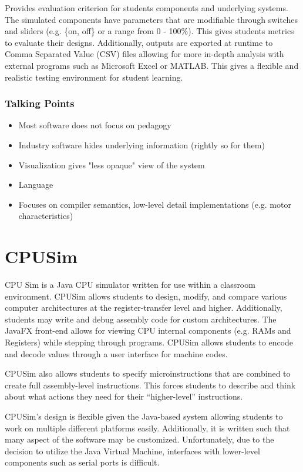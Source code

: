 Provides evaluation criterion for students components and underlying systems. The simulated components have parameters that are modifiable through switches and sliders (e.g. \{on, off\} or a range from 0 - 100\%). This gives students metrics to evaluate their designs. Additionally, outputs are exported at runtime to Comma Separated Value (CSV) files allowing for more in-depth analysis with external programs such as Microsoft Excel or MATLAB. This gives a flexible and realistic testing environment for student learning. 

\subsubsection{Talking Points}

\begin{itemize}
\item Most software does not focus on pedagogy
\item Industry software hides underlying information (rightly so for them)
\item Visualization gives "less opaque" view of the system
\item Language 
\item Focuses on compiler semantics, low-level detail implementations (e.g. motor characteristics)
\end{itemize}

\section{CPUSim \cite{Skrien2001}}

CPU Sim is a Java CPU simulator written for use within a classroom environment. CPUSim allows students to design, modify, and compare various computer architectures at the register-transfer level and higher. Additionally, students may write and debug assembly code for custom architectures. The JavaFX front-end allows for viewing CPU internal components (e.g. RAMs and Registers) while stepping through programs. CPUSim allows students to encode and decode values through a user interface for machine codes. 

CPUSim also allows students to specify microinstructions that are combined to create full assembly-level instructions. This forces students to describe and think about what actions they need for their ``higher-level'' instructions. 

CPUSim's design is flexible given the Java-based system allowing students to work on multiple different platforms easily. Additionally, it is written such that many aspect of the software may be customized. Unfortunately, due to the decision to utilize the Java Virtual Machine, interfaces with lower-level components such as serial ports is difficult. 

